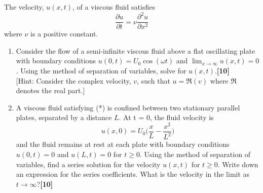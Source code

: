\documentclass[a4paper]{article}
\begin{document}
\newpage
\begin{qns}
The velocity, $u(x, t)$, of a viscous fluid satisfies
\begin{equation}
\frac{\partial u}{\partial t}=\nu\frac{\partial^2u}{\partial x^2}\tag{*}
\end{equation}
where $\nu$ is a positive constant.
\begin{enumerate}[label=(\roman*)]
    \item Consider the flow of a semi-infinite viscous fluid above a flat oscillating plate with boundary conditions $u(0,t)=U_0\cos(\omega t)$ and $\lim_{x\rightarrow\infty}u(x,t)=0$. Using the method of separation of variables, solve for $u(x, t)$.\hfill \textbf{[10]}\\[5pt]
[Hint: Consider the complex velocity, $v$, such that $u = \Re(v)$ where $\Re$ denotes the real part.]
\item  A viscous fluid satisfying (*) is confined between two stationary parallel plates, separated by a distance $L$. At t = 0, the fluid velocity is
$$u(x,0)=U_0\bigg(\frac{x}{L}-\frac{x^2}{L^2}\bigg)$$
and the fluid remains at rest at each plate with boundary conditions $u(0,t)=0$ and $u(L,t)=0$ for $t\geq0$. Using the method of separation of variables, find a series solution for the velocity $u(x, t)$ for $t\geq0$. Write down an expression for the series coefficients. What is the velocity in the limit as $t\rightarrow\infty$?\hfill \textbf{[10]}
\end{enumerate}
\end{qns}
\end{document}
